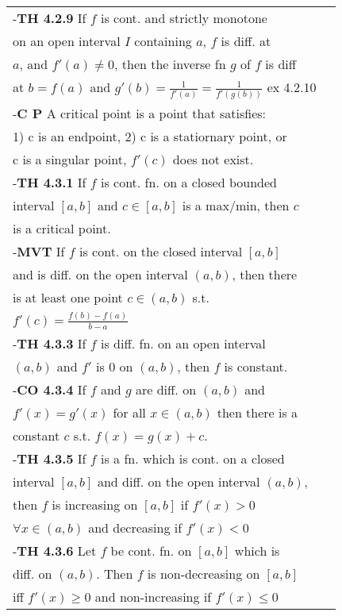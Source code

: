 \documentclass[10 pt,landscape]{article}
\begin{document}
\begin{multicols}{4}
\begin{tabular}{@{}ll@{}}
\end{tabular} 

\begin{tabular}{@{}ll@{}}

-\textbf{TH 4.2.9} If $f$ is cont. and strictly monotone\\ on an open interval $I$ containing $a$, $f$ is diff. at\\ $a$, and $f'(a) \neq 0$, then the inverse fn $g$ of $f$ is diff\\ at $b=f(a)$ and $g'(b)=\frac{1}{f'(a)}=\frac{1}{f'(g(b))}$ ex 4.2.10\\

-\textbf{C P} A critical point is a point that satisfies:\\
	
1) c is an endpoint, 2) c is a statiornary point, or\\ c is a singular point, $f'(c)$ does not exist.\\
-\textbf{TH 4.3.1} If $f$ is cont. fn. on a closed bounded \\ interval $[a,b]$ and $c \in [a,b]$ is a max/min, then $c$ \\ is a critical point.\\
-\textbf{MVT} If $f$ is cont. on the closed interval $[a,b]$\\ and is diff. on the open interval $(a,b)$, then there \\is at least one point $c \in (a,b)$ s.t.\\ $f'(c)=\frac{f(b)-f(a)}{b-a}$\\
-\textbf{TH 4.3.3} If $f$ is diff. fn. on an open interval\\ $(a,b)$ and $f'$ is 0 on $(a,b)$, then $f$ is constant.\\
-\textbf{CO 4.3.4} If $f$ and $g$ are diff. on $(a,b)$ and \\ $f'(x)=g'(x)$ for all $x \in (a,b)$ then there is a \\ constant $c$ s.t. $f(x)=g(x)+c$.\\
-\textbf{TH 4.3.5} If $f$ is a fn. which is cont. on a closed\\
interval $[a,b]$ and diff. on the open interval $(a,b)$,\\ then $f$ is increasing on $[a,b]$ if $f'(x)>0 $\\ $\forall x \in (a,b)$ and decreasing if $f'(x)<0$\\
-\textbf{TH 4.3.6} Let $f$ be cont. fn. on $[a,b]$ which is \\
diff. on $(a,b)$. Then $f$ is non-decreasing on $[a,b]$ \\iff $f'(x)\geq 0$ and non-increasing if $f'(x)\leq 0$\\

\end{tabular}
\end{multicols}
\end{document}
